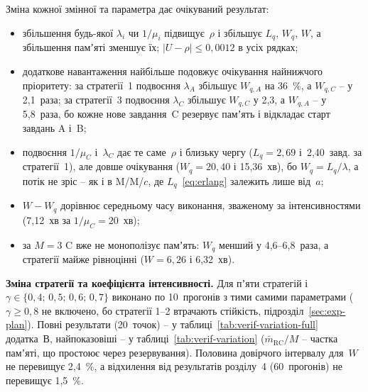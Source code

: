 

Зміна кожної змінної та параметра дає очікуваний результат:
\begin{itemize}
  \item збільшення будь-якої $\lambda_i$ чи $1/\mu_i$ підвищує~$\rho$ і збільшує $L_q$, $W_q$, $W$, а
    збільшення памʼяті зменшує їх; $|U - \rho| \le 0{,}0012$ в усіх рядках;
  \item додаткове навантаження найбільше подовжує очікування найнижчого пріоритету: за стратегії~1
    подвоєння $\lambda_A$ збільшує $W_{q,A}$ на 36~\%, а $W_{q,C}$ -- у 2,1~раза; за стратегії~3
    подвоєння $\lambda_C$ збільшує $W_{q,C}$ у 2,3, а $W_{q,A}$ -- у 5,8~раза, бо кожне нове
    завдання~C резервує памʼять і відкладає старт завдань A і~B;
  \item подвоєння $1/\mu_C$ і~$\lambda_C$ дає те саме~$\rho$ і близьку чергу ($L_q = 2{,}69$
    і~2,40~завд. за стратегії~1), але довше очікування ($W_q = 20{,}40$ і 15,36~хв), бо
    $W_q = L_q/\lambda$, а потік не зріс -- як і в M/M/$c$, де $L_q$~\eqref{eq:erlang} залежить лише
    від~$a$;
  \item $W - W_q$ дорівнює середньому часу виконання, зваженому за інтенсивностями (7,12~хв за
    $1/\mu_C = 20$~хв);
  \item за $M = 3$ C вже не монополізує памʼять: $W_q$ менший у 4,6--6,8~раза, а стратегії майже
    рівноцінні ($W = 6{,}26$ і 6,32~хв).
\end{itemize}

\textbf{Зміна стратегії та коефіцієнта інтенсивності.} Для пʼяти стратегій і
$\gamma \in \{0{,}4;\,0{,}5;\,0{,}6;\,0{,}7\}$ виконано по 10~прогонів з тими самими параметрами
($\gamma \ge 0{,}8$ не включено, бо стратегії 1--2 втрачають стійкість, підрозділ~\ref{sec:exp-plan}).
Повні результати (20~точок) -- у таблиці~\ref{tab:verif-variation-full} додатка~В, найпоказовіші --
у таблиці~\ref{tab:verif-variation} ($\bar m_{\text{RC}}/M$ -- частка памʼяті, що простоює через
резервування). Половина довірчого інтервалу для~$W$ не перевищує 2,4~\%, а відхилення від
результатів розділу~4 (60~прогонів) не перевищує 1,5~\%.



